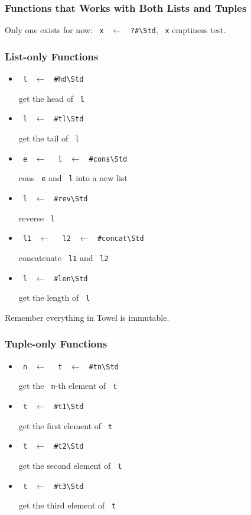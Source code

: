 \documentclass{report}
\newcommand{\mstd}[1]{\texttt{#1\textbackslash Std}}
\newcommand{\mtilde}[1]{\textasciitilde}
\newcommand{\marg}[1]{\texttt{\mtilde ~#1}}
\newcommand{\mla}[0]{~$\leftarrow$ ~}
\begin{document}
\subsubsection{Functions that Works with Both Lists and Tuples}

Only one exists for now: \marg{x} \mla \mstd{?\#}, \marg{x} emptiness test.

\subsubsection{List-only Functions}

\begin{itemize}
\item \marg{l} \mla \mstd{\#hd}

get the head of \marg{l}
\item \marg{l} \mla \mstd{\#tl}

get the tail of \marg{l}
\item \marg{e} \mla \marg{l} \mla \mstd{\#cons}

cons \marg{e} and \marg{l} into a new list
\item \marg{l} \mla \mstd{\#rev}

reverse \marg{l}
\item \marg{l1} \mla \marg{l2} \mla \mstd{\#concat}

concatenate \marg{l1} and \marg{l2}
\item \marg{l} \mla \mstd{\#len}

get the length of \marg{l}
\end{itemize}

\begin{mdframed}[style=hint]
  Remember everything in Towel is immutable.
\end{mdframed}

\subsubsection{Tuple-only Functions}

\begin{itemize}
\item \marg{n} \mla \marg{t} \mla \mstd{\#tn}

get the \marg{n}-th element of \marg{t}
\item \marg{t} \mla \mstd{\#t1}

get the first element of \marg{t}
\item \marg{t} \mla \mstd{\#t2}

get the second element of \marg{t}
\item \marg{t} \mla \mstd{\#t3}

get the third element of \marg{t}
\end{itemize}
\end{document}

